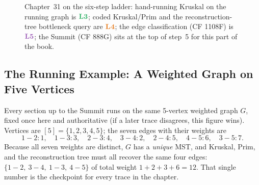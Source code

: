 \begin{figure}[H]
\centering
{}
\caption{Chapter~31 on the six-step ladder: hand-running Kruskal on the running
graph is \(\lv3\); coded Kruskal/Prim and the reconstruction-tree bottleneck
query are \(\lv4\); the edge classification (CF 1108F) is \(\lv5\); the Summit
(CF 888G) sits at the top of step~5 for this part of the book.}
\end{figure}

\subsection*{The Running Example: A Weighted Graph on Five Vertices}

Every section up to the Summit runs on the same 5-vertex weighted graph \(G\),
fixed once here and authoritative (if a later trace disagrees, this figure
wins).  Vertices are \([5]=\{1,2,3,4,5\}\); the seven edges with their weights
are
\[
  1\!-\!2:1,\quad 1\!-\!3:3,\quad 2\!-\!3:4,\quad 3\!-\!4:2,\quad
  2\!-\!4:5,\quad 4\!-\!5:6,\quad 3\!-\!5:7 .
\]
Because all seven weights are distinct, \(G\) has a \emph{unique} MST, and
Kruskal, Prim, and the reconstruction tree must all recover the same four edges:
\(\{1\!-\!2,\ 3\!-\!4,\ 1\!-\!3,\ 4\!-\!5\}\) of total weight \(1+2+3+6=12\).
That single number is the checkpoint for every trace in the chapter.


